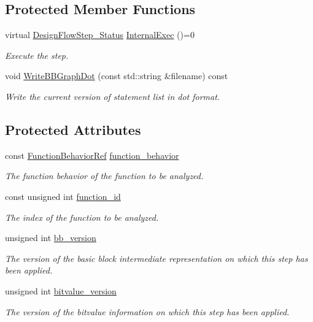 \subsection*{Protected Member Functions}
\begin{DoxyCompactItemize}
\item 
virtual \hyperlink{design__flow__step_8hpp_afb1f0d73069c26076b8d31dbc8ebecdf}{Design\+Flow\+Step\+\_\+\+Status} \hyperlink{classFunctionFrontendFlowStep_a00612f7fb9eabbbc8ee7e39d34e5ac68}{Internal\+Exec} ()=0
\begin{DoxyCompactList}\small\item\em Execute the step. \end{DoxyCompactList}\item 
void \hyperlink{classFunctionFrontendFlowStep_a4b3ca147e7b029e207a85b60fd0cb592}{Write\+B\+B\+Graph\+Dot} (const std\+::string \&filename) const
\begin{DoxyCompactList}\small\item\em Write the current version of statement list in dot format. \end{DoxyCompactList}\end{DoxyCompactItemize}
\subsection*{Protected Attributes}
\begin{DoxyCompactItemize}
\item 
const \hyperlink{function__behavior_8hpp_affbc6a46ab86ddfabe31c10986d333dc}{Function\+Behavior\+Ref} \hyperlink{classFunctionFrontendFlowStep_a3690e91c0424f03e4aa589f04ee53aa7}{function\+\_\+behavior}
\begin{DoxyCompactList}\small\item\em The function behavior of the function to be analyzed. \end{DoxyCompactList}\item 
const unsigned int \hyperlink{classFunctionFrontendFlowStep_a58ef2383ad1a212a8d3f396625a4b616}{function\+\_\+id}
\begin{DoxyCompactList}\small\item\em The index of the function to be analyzed. \end{DoxyCompactList}\item 
unsigned int \hyperlink{classFunctionFrontendFlowStep_a74f80c279317d4e73e0d84b4172ffeaa}{bb\+\_\+version}
\begin{DoxyCompactList}\small\item\em The version of the basic block intermediate representation on which this step has been applied. \end{DoxyCompactList}\item 
unsigned int \hyperlink{classFunctionFrontendFlowStep_a0ba6ea352317faf2d378a900747fe340}{bitvalue\+\_\+version}
\begin{DoxyCompactList}\small\item\em The version of the bitvalue information on which this step has been applied. \end{DoxyCompactList}\end{DoxyCompactItemize}
